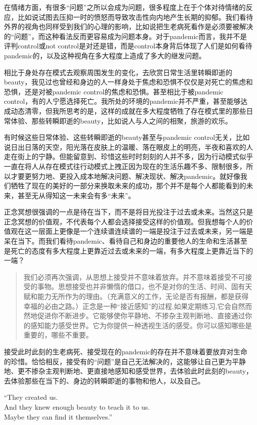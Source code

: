 在情绪方面，有很多“问题”之所以会成为问题，很多程度上在于个体对待情绪的反应，比如说试图去压抑一时的愤怒而导致攻击性向内地产生长期的抑郁。我们看待外界的视角也同样受到我们的心理的影响，比如说把生老病死看作是必须要被解决的“问题”，而这种看法反而更容易成为问题本身。对于pandemic而言，我并不是评判control或not control是对还是错，而是control本身背后体现了人们是如何看待pandemic的，以及这种视角在多大程度上造成了多大的继发问题。

相比于身处存在模式去观察周围发生的变化，去欣赏日常生活里转瞬即逝的beauty，我见过也曾经和身边的人一样身处于焦虑和恐惧\pozhehao{}不仅仅是对死亡的焦虑和恐惧，还是对被pandemic control的焦虑和恐惧。甚至相比于被pandemic control，有的人宁愿选择死亡。我所处的环境的pandemic并不严重，甚至能够达成动态清零，但我所思考的是，这样的成就在多大程度牺牲了存在模式里的那些日常体验、那些转瞬即逝的beauty，比如说人与人之间的相聚，旅游的欢乐。

有时候这些日常体验、这些转瞬即逝的beauty甚至与pandemic control无关，比如说日出日落的天空，阳光落在皮肤上的温暖、落在眼皮上的明亮，半夜和喜欢的人走在街上的宁静。但能留意到、珍惜这些时时刻刻的人并不多，因为行动模式似乎一直在将人从存在模式往行动模式上拽\pozhehao{}正因为现在的生活乐趣不多、限制很多，所以才要更努力地、更投入成本地解决问题、解决现状、解决pandemic。就好像我们牺牲了现在的美好的一部分来换取未来的成功，那个并不是每个人都能看到的未来，甚至无从得知这一未来会有多“未来”。

正念冥想很强调的一点是待在当下，而不是将目光投注于过去或未来。当然这只是正念冥想的价值观，不代表每个人都会选择接受这样的价值观。但我想每个人的价值观在这一层面上更像是一个连续谱\pozhehao{}连续谱的一端是投注于过去或未来，另一端是呆在当下。而我们看待pandemic、看待自己和身边的重要他人的生命和生活甚至是死亡的态度有多大程度上更靠近过去或未来的一端，有多大程度上更靠近当下的一端？

\blockquote{
	我们必须再次强调，从思想上接受并不意味着放弃。并不意味着接受不可接受的事物。思想接受也并非懒惰的借口，也不是对你的生活、时间、固有天赋和能力无所作为的理由。（充满意义的工作，无论是否有报酬，都是获得幸福的必由之路。）正念是一种“接近感知”的过程,如果定期练习,它会自然而然地促进你不断进步。它能够使你平静地、不掺杂主观判断地、直接通过你的感知能力感受世界。它为你提供一种透视生活的感受。你可以感知哪些是重要的，哪些不重要。
}

接受此时此刻的生老病死、接受现在的pandemic的存在并不意味着要放弃对生命的珍惜。恰恰相反，接受有的“问题”是自己无法解决的，这能够让自己更为平静地、更不掺杂主观判断地、更直接地感知和感受世界，去体验此时此刻的beauty，去体验那些在当下的、身边的转瞬即逝的事物和他人，以及自己。\par

\noindent\begin{minipage}{\linewidth}
	\center\quotefont
	``They created us.\\
	And they knew enough beauty to teach it to us.\\
	Maybe they can find it themselves.''
\end{minipage}


